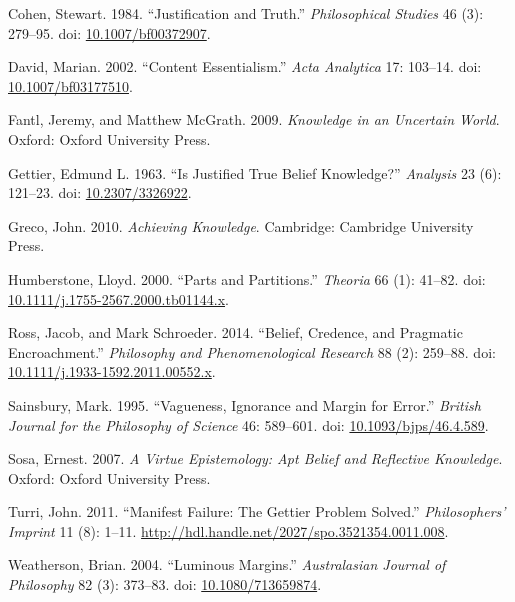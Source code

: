 \documentclass[
  11pt,
  letterpaper,
  DIV=11,
  numbers=noendperiod,
  twoside]{scrartcl}
\newlength{\cslhangindent}
\newenvironment{CSLReferences}[2] %
 {\begin{list}{}{%
  \setlength{\itemindent}{0pt}
  \setlength{\leftmargin}{0pt}
  \setlength{\parsep}{0pt}
  \ifodd #1
   \setlength{\leftmargin}{\cslhangindent}
   \setlength{\itemindent}{-1\cslhangindent}
  \fi
  \setlength{\itemsep}{#2\baselineskip}}}
 {\end{list}}
\begin{document}
\label{refs}
\begin{CSLReferences}{1}{0}
Cohen, Stewart. 1984. {``Justification and Truth.''} \emph{Philosophical
Studies} 46 (3): 279--95. doi:
\href{https://doi.org/10.1007/bf00372907}{10.1007/bf00372907}.

David, Marian. 2002. {``Content Essentialism.''} \emph{Acta Analytica}
17: 103--14. doi:
\href{https://doi.org/10.1007/bf03177510}{10.1007/bf03177510}.

Fantl, Jeremy, and Matthew McGrath. 2009. \emph{Knowledge in an
Uncertain World}. Oxford: Oxford University Press.

Gettier, Edmund L. 1963. {``Is Justified True Belief Knowledge?''}
\emph{Analysis} 23 (6): 121--23. doi:
\href{https://doi.org/10.2307/3326922}{10.2307/3326922}.

Greco, John. 2010. \emph{Achieving Knowledge}. Cambridge: Cambridge
University Press.

Humberstone, Lloyd. 2000. {``Parts and Partitions.''} \emph{Theoria} 66
(1): 41--82. doi:
\href{https://doi.org/10.1111/j.1755-2567.2000.tb01144.x}{10.1111/j.1755-2567.2000.tb01144.x}.

Ross, Jacob, and Mark Schroeder. 2014. {``Belief, Credence, and
Pragmatic Encroachment.''} \emph{Philosophy and Phenomenological
Research} 88 (2): 259--88. doi:
\href{https://doi.org/10.1111/j.1933-1592.2011.00552.x}{10.1111/j.1933-1592.2011.00552.x}.

Sainsbury, Mark. 1995. {``Vagueness, Ignorance and Margin for Error.''}
\emph{British Journal for the Philosophy of Science} 46: 589--601. doi:
\href{https://doi.org/10.1093/bjps/46.4.589}{10.1093/bjps/46.4.589}.

Sosa, Ernest. 2007. \emph{A Virtue Epistemology: Apt Belief and
Reflective Knowledge}. Oxford: Oxford University Press.

Turri, John. 2011. {``Manifest Failure: The Gettier Problem Solved.''}
\emph{Philosophers' Imprint} 11 (8): 1--11.
\url{http://hdl.handle.net/2027/spo.3521354.0011.008}.

Weatherson, Brian. 2004. {``Luminous Margins.''} \emph{Australasian
Journal of Philosophy} 82 (3): 373--83. doi:
\href{https://doi.org/10.1080/713659874}{10.1080/713659874}.


\end{CSLReferences}
\end{document}
